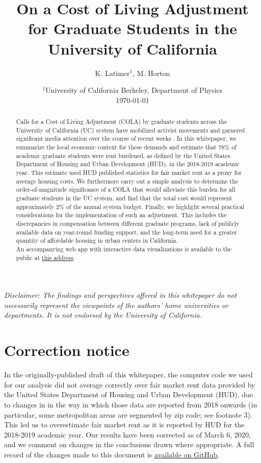 \documentclass{article}
\title{On a Cost of Living Adjustment for Graduate Students in the University of California}
\author{K. Latimer$^{1}$, M. Horton}
\date{%
    $^1$University of California Berkeley, Department of Physics\\%
    \today
}
\begin{document}
\maketitle

\begin{abstract}
Calls for a Cost of Living Adjustment (COLA) by graduate students across the University of California (UC) system have mobilized activist movements and garnered significant media attention over the course of recent weeks \cite{nyt,latimes,cnn}. In this whitepaper, we summarize the local economic context for these demands and estimate that 78\% of academic graduate students were rent burdened, as defined by the United States Department of Housing and Urban Development (HUD), in the 2018-2019 academic year. This estimate used HUD published statistics for fair market rent as a proxy for average housing costs. We furthermore carry out a simple analysis to determine the order-of-magnitude significance of a COLA that would alleviate this burden for all graduate students in the UC system, and find that the total cost would represent approximately 2\% of the annual system budget. Finally, we highlight several practical considerations for the implementation of such an adjustment. This includes the discrepancies in compensation between different graduate programs, lack of publicly available data on year-round funding support, and the long-term need for a greater quantity of affordable housing in urban centers in California.\\

An accompanying web app with interactive data visualizations is available to the public at \href{https://uc-cola.herokuapp.com}{this address}.
\end{abstract}

\noindent\emph{Disclaimer: The findings and perspectives offered in this whitepaper do not necessarily represent the viewpoints of the authors' home universities or departments. It is not endorsed by the University of California.}

\newpage
\setcounter{section}{-1}
\section{Correction notice}
\label{sec0}
In the originally-published draft of this whitepaper, the computer code we used for our analysis did not average correctly over fair market rent data provided by the United States Department of Housing and Urban Development (HUD), due to changes in in the way in which those data are reported from 2018 onwards (in particular, some metropolitan areas are segmented by zip code; see footnote 3). This led us to overestimate fair market rent as it is reported by HUD for the 2018-2019 academic year. Our results have been corrected as of March 6, 2020, and we comment on changes in the conclusions drawn where appropriate. A full record of the changes made to this document is \href{https://github.com/mkhorton/cola-colab}{available on GitHub}. 
\end{document}
